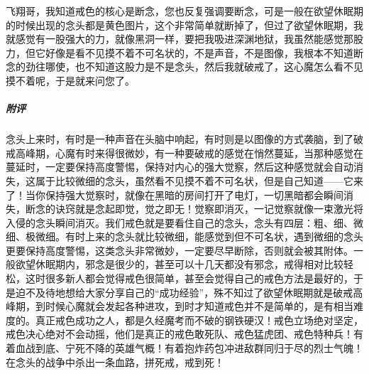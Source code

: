 \begin{case}
    飞翔哥，我知道戒色的核心是断念，您也反复强调要断念，可是一般在欲望休眠期的时候出现的念头都是黄色图片，这个非常简单就断掉了，但过了欲望休眠期，我就感觉有一股强大的力，就像黑洞一样，要把我吸进深渊地狱，我虽然能感觉那股力，但它好像是看不见摸不着不可名状的，不是声音，不是图像，我根本不知道断念的劲往哪使，也不知道这股力是不是念头，然后我就破戒了，这心魔怎么看不见摸不着呢，于是就来问您了。
    \subparagraph{附评} 念头上来时，有时是一种声音在头脑中响起，有时则是以图像的方式袭脑，到了破戒高峰期，心魔有时来得很微妙，有一种要破戒的感觉在悄然蔓延，当那种感觉在蔓延时，一定要保持高度警惕，保持对内心的强大觉察，然后这种感觉就会自动消失，这属于比较微细的念头，虽然看不见摸不着不可名状，但是自己知道——它来了！当你保持强大觉察时，就像在黑暗的房间打开了电灯，一切黑暗都会瞬间消失，断念的诀窍就是念起即觉，觉之即无！觉察即消灭，一记觉察就像一束激光将入侵的念头瞬间消灭。我们戒色就是要看住自己的念头，念头有四层：粗、细、微细、极微细。有时上来的念头就比较微细，能感觉到但不可名状，遇到微细的念头更要保持高度警惕，这类念头非常微妙，一定要尽早断除，否则就会被其附体。一般欲望休眠期内，邪念是很少的，甚至可以十几天都没有邪念，戒得相对比较轻松，这时很多新人都会觉得戒色很简单，甚至会觉得自己的戒色方法是最好的，于是迫不及待地想给大家分享自己的“成功经验”，殊不知过了欲望休眠期就是破戒高峰期，到时候心魔就会发起各种进攻，到时才知道戒色并不是简单的，是有相当难度的。真正戒色成功之人，都是久经魔考而不破的钢铁硬汉！戒色立场绝对坚定，戒色决心绝对不会动摇，他们是真正的戒色敢死队、戒色猛虎团、戒色特种兵！有着血战到底、宁死不降的英雄气概！有着抱炸药包冲进敌群同归于尽的烈士气魄！在念头的战争中杀出一条血路，拼死戒，戒到死！
\end{case}

